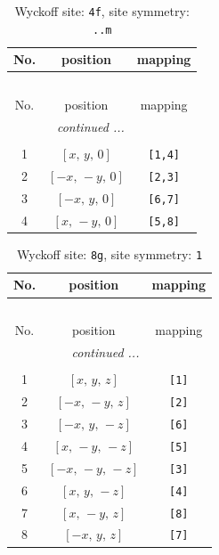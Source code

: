 \documentclass[fleqn,8pt]{jsarticle}
\begin{document}
\begin{longtable}{ccc}
\caption{Wyckoff site: {\tt 4f}, site symmetry: {\tt ..m}}
 \\
 \hline \hline
No. & position & mapping \\ \hline \endfirsthead

\multicolumn{2}{l}{\tablename\ \thetable{}} \\
 \hline \hline
No. & position & mapping \\ \hline \endhead

 \hline \hline
\multicolumn{2}{r}{\footnotesize\it continued ...} \\ \endfoot

 \hline \hline
\multicolumn{2}{r}{} \\ \endlastfoot

1 & $\left[ x,\, y,\, 0 \right]$ & {\tt [1,4]} \\ \hline
2 & $\left[ - x,\, - y,\, 0 \right]$ & {\tt [2,3]} \\ \hline
3 & $\left[ - x,\, y,\, 0 \right]$ & {\tt [6,7]} \\ \hline
4 & $\left[ x,\, - y,\, 0 \right]$ & {\tt [5,8]} \\
\end{longtable}
\renewcommand{\arraystretch}{1.2}
\begin{longtable}{ccc}
\caption{Wyckoff site: {\tt 8g}, site symmetry: {\tt 1}}
 \\
 \hline \hline
No. & position & mapping \\ \hline \endfirsthead

\multicolumn{2}{l}{\tablename\ \thetable{}} \\
 \hline \hline
No. & position & mapping \\ \hline \endhead

 \hline \hline
\multicolumn{2}{r}{\footnotesize\it continued ...} \\ \endfoot

 \hline \hline
\multicolumn{2}{r}{} \\ \endlastfoot

1 & $\left[ x,\, y,\, z \right]$ & {\tt [1]} \\ \hline
2 & $\left[ - x,\, - y,\, z \right]$ & {\tt [2]} \\ \hline
3 & $\left[ - x,\, y,\, - z \right]$ & {\tt [6]} \\ \hline
4 & $\left[ x,\, - y,\, - z \right]$ & {\tt [5]} \\ \hline
5 & $\left[ - x,\, - y,\, - z \right]$ & {\tt [3]} \\ \hline
6 & $\left[ x,\, y,\, - z \right]$ & {\tt [4]} \\ \hline
7 & $\left[ x,\, - y,\, z \right]$ & {\tt [8]} \\ \hline
8 & $\left[ - x,\, y,\, z \right]$ & {\tt [7]} \\
\end{longtable}
\end{document}
